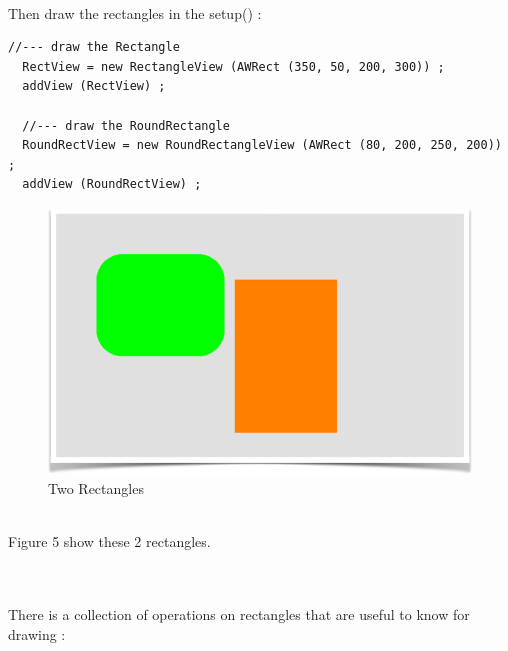 \documentclass[a4paper,11pt]{extarticle}
\begin{document}
~\\ Then draw the rectangles in the setup() :

\begin{lstlisting}[language=Arduinonl]
  //--- draw the Rectangle
  RectView = new RectangleView (AWRect (350, 50, 200, 300)) ;
  addView (RectView) ;   
  
  //--- draw the RoundRectangle
  RoundRectView = new RoundRectangleView (AWRect (80, 200, 250, 200)) ;
  addView (RoundRectView) ;   
\end{lstlisting}

\begin{figure}[htbp]
   \centering
   \includegraphics[scale=0.7]{AWFig7.png} 
   \caption{Two Rectangles}
   \label{fig:7}
\end{figure}

~\\ Figure 5 show these 2 rectangles.

~\\ 

~\\ There is a collection of operations on rectangles that are useful to know for drawing :
\end{document}
